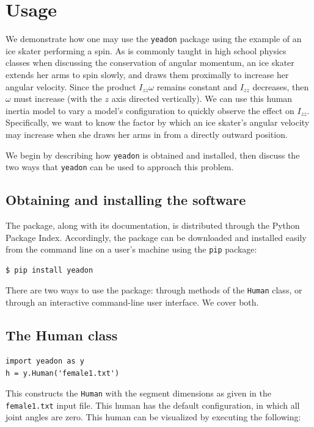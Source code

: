 \documentclass[10pt]{article}
\begin{document}
\section*{Usage}

We demonstrate how one may use the \verb+yeadon+ package using the example of
an ice skater performing a spin. As is commonly taught in high school physics
classes when discussing the conservation of angular momentum, an ice skater
extends her arms to spin slowly, and draws them proximally to increase her
angular velocity. Since the product $I_{zz}\omega$ remains constant and $I_{zz}$
decreases, then $\omega$ must increase (with the $z$ axis directed vertically).
We can use this human inertia model to vary a model's configuration to quickly
observe the effect on $I_{zz}$. Specifically, we want to know the factor by
which an ice skater's angular velocity may increase when she draws her arms in
from a directly outward position.

We begin by describing how \verb+yeadon+ is obtained and installed, then
discuss the two ways that \verb+yeadon+ can be used to approach this problem.

\subsection*{Obtaining and installing the software}

The package, along with its documentation, is distributed through the Python
Package Index. Accordingly, the package can be downloaded and installed easily
from the command line on a user's machine using the \verb+pip+ package:

\begin{verbatim}
$ pip install yeadon
\end{verbatim}

There are two ways to use the package: through methods of the \verb+Human+
class, or through an interactive command-line user interface. We cover both.



\subsection*{The Human class}

\begin{verbatim}
import yeadon as y
h = y.Human('female1.txt')
\end{verbatim}

This constructs the \verb+Human+ with the segment dimensions as given in the
\verb+female1.txt+ input file. This human has the default configuration, in
which all joint angles are zero. This human can be visualized by executing the
following:
\end{document}
